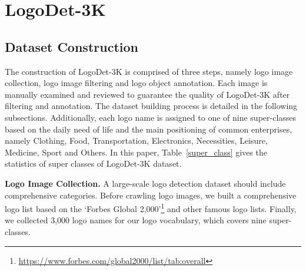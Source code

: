 \documentclass[journal]{IEEEtran}
\begin{document}
\section{LogoDet-3K}
\subsection{Dataset Construction}
The construction of LogoDet-3K is comprised of three steps, namely logo image collection, logo image filtering and logo object annotation. Each image is manually examined and reviewed to guarantee the quality of LogoDet-3K after filtering and annotation. The dataset building process is detailed in the following subsections. Additionally, each logo name is assigned to one of nine super-classes based on the daily need of life and the main positioning of common enterprises, namely Clothing, Food, Transportation, Electronics, Necessities, Leisure, Medicine, Sport and Others. In this paper, Table~\ref{super_class} gives the statistics of super classes of LogoDet-3K dataset.
\begin{table}[!t]
	\centering
	\caption{Data statistics on LogoDet-3K.}
	\label{super_class}
	\renewcommand\arraystretch{1.05}
\end{table}


\textbf{Logo Image Collection.} A large-scale logo detection dataset should include comprehensive categories. Before crawling logo images, we built a comprehensive logo list based on the `Forbes Global 2,000'\footnote{\url{https://www.forbes.com/global2000/list/tab:overall}} and other famous logo  lists. Finally, we collected 3,000 logo names  for our logo vocabulary, which covers nine super-classes.
\end{document}
